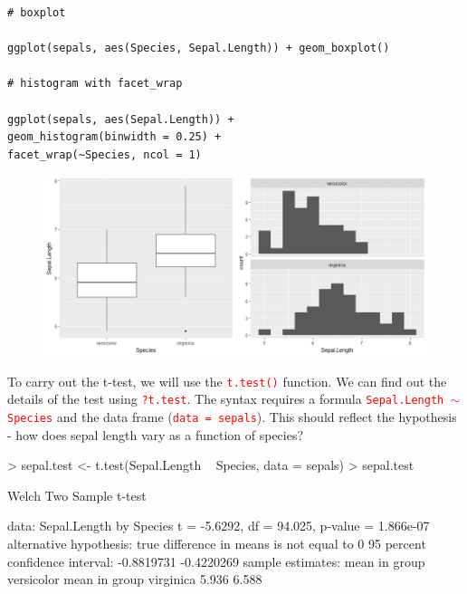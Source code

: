 \documentclass[a4paper,12pt]{article}
\newcommand\code[1]{\textcolor{red}{\texttt{#1}}}
\begin{document}
\begin{shaded}
\begin{verbatim}
# boxplot

ggplot(sepals, aes(Species, Sepal.Length)) + geom_boxplot()

# histogram with facet_wrap

ggplot(sepals, aes(Sepal.Length)) + 
geom_histogram(binwidth = 0.25) + 
facet_wrap(~Species, ncol = 1)
\end{verbatim}
\end{shaded}

\begin{figure}[h]
\centering 
\includegraphics[width=1\textwidth]{figs/boxplothist.png}
\label{fig:boxplothist}
\end{figure} 


To carry out the t-test, we will use the \code{t.test()} function. We can find out the details of the test using \code{?t.test}. The syntax requires a formula \code{Sepal.Length $\sim$ Species} and the data frame (\code{data = sepals}). This should reflect the hypothesis - how does sepal length vary as a function of species? \\


\begin{shaded}
\begin{Schunk}
\begin{Sinput}
> sepal.test <- t.test(Sepal.Length ~ Species, data = sepals)
> sepal.test
\end{Sinput}
\begin{Soutput}
	Welch Two Sample t-test

data:  Sepal.Length by Species
t = -5.6292, df = 94.025, p-value = 1.866e-07
alternative hypothesis: true difference in means is not equal to 0
95 percent confidence interval:
 -0.8819731 -0.4220269
sample estimates:
mean in group versicolor  mean in group virginica 
                   5.936                    6.588 
\end{Soutput}
\end{Schunk}
\end{shaded}
\end{document}
